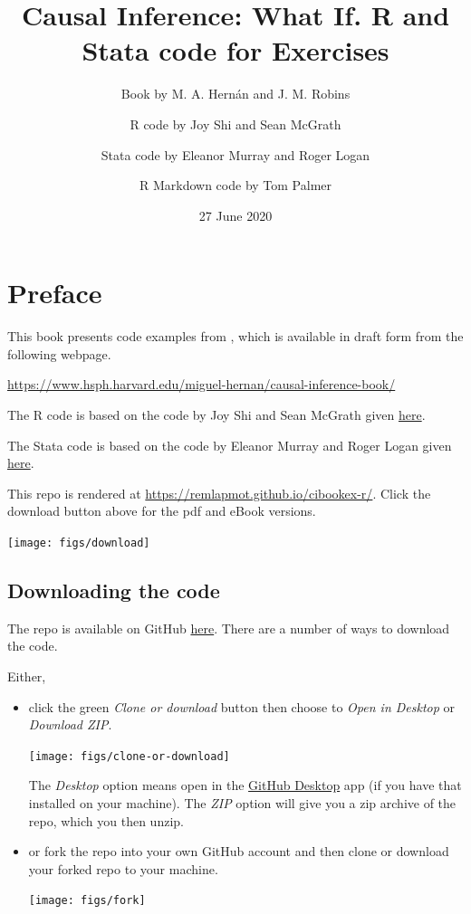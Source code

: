 \documentclass[
  10pt,
]{book}
\title{Causal Inference: What If. R and Stata code for Exercises}
\author{Book by M. A. Hernán and J. M. Robins \and R code by Joy Shi and Sean McGrath \and Stata code by Eleanor Murray and Roger Logan \and R Markdown code by Tom Palmer}
\date{27 June 2020}
\begin{document}
\maketitle

\thispagestyle{empty}

{
\setcounter{tocdepth}{1}
\tableofcontents
}
\hypertarget{preface}{%
\chapter*{Preface}\label{preface}}

This book presents code examples from \citet{ci-book}, which is available in draft form from the following webpage.

\url{https://www.hsph.harvard.edu/miguel-hernan/causal-inference-book/}

The R code is based on the code by Joy Shi and Sean McGrath given \href{https://cdn1.sph.harvard.edu/wp-content/uploads/sites/1268/1268/20/Rcode_CIpart2.zip}{here}.

The Stata code is based on the code by Eleanor Murray and Roger Logan given \href{https://cdn1.sph.harvard.edu/wp-content/uploads/sites/1268/2019/11/stata_part2.zip}{here}.

This repo is rendered at \url{https://remlapmot.github.io/cibookex-r/}. Click the download button above for the pdf and eBook versions.

\begin{center}\texttt{[image: figs/download]} \end{center}

\hypertarget{downloading-the-code}{%
\section{Downloading the code}\label{downloading-the-code}}

The repo is available on GitHub \href{https://github.com/remlapmot/cibookex-r}{here}. There are a number of ways to download the code.

Either,

\begin{itemize}
\item
  click the green \emph{Clone or download} button then choose to \emph{Open in Desktop} or \emph{Download ZIP}.

  \begin{center}\texttt{[image: figs/clone-or-download]} \end{center}

  The \emph{Desktop} option means open in the \href{https://desktop.github.com/}{GitHub Desktop} app (if you have that installed on your machine). The \emph{ZIP} option will give you a zip archive of the repo, which you then unzip.
\item
  or fork the repo into your own GitHub account and then clone or download your forked repo to your machine.

  \begin{center}\texttt{[image: figs/fork]} \end{center}
\end{itemize}
\end{document}

